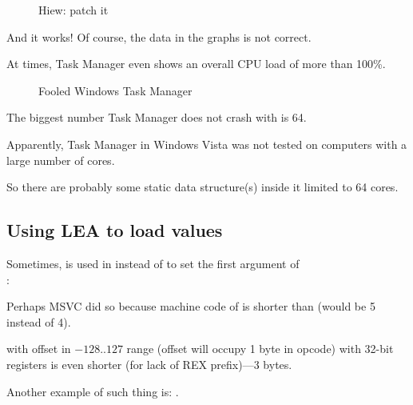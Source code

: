 \begin{figure}[H]
\centering
{}
\caption{Hiew: patch it}
\end{figure}

And it works!
Of course, the data in the graphs is not correct.

At times, Task Manager even shows an overall CPU load of more than 100\%.

\begin{figure}[H]
\centering
{}
\caption{Fooled Windows Task Manager}
\end{figure}

The biggest number Task Manager does not crash with is 64.

Apparently, Task Manager in Windows Vista was not tested on computers with a large number of cores.

So there are probably some static data structure(s) inside it limited to 64 cores.

\subsection{Using LEA to load values}
\label{TaskMgr_LEA}

Sometimes,  is used in  instead of  to set the first argument of \\
:




Perhaps \ac{MSVC} did so because machine code of  is shorter than  (would be 5 instead of 4).

 with offset in $-128..127$ range (offset will occupy 1 byte in opcode) with 32-bit registers is even shorter (for lack of REX prefix)---3 bytes.

Another example of such thing is: .
